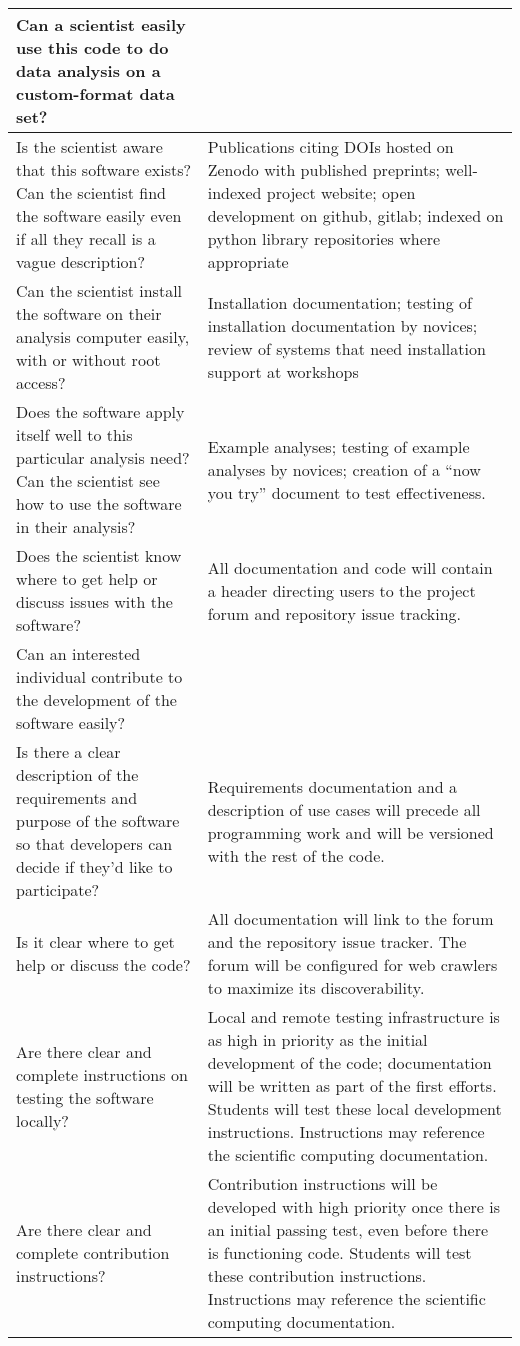 \begin{tabularx}{\textwidth}{XX}
    Can a scientist easily use this code to do data analysis on a custom-format data set? & \\
    \toprule

    Is the scientist aware that this software exists?  Can the scientist find the software easily even if all they recall is a vague description?
    & Publications citing DOIs hosted on Zenodo with published preprints; well-indexed project website; open development on github, gitlab; indexed on python library repositories where appropriate \\
    Can the scientist install the software on their analysis computer easily, with or without root access?
    & Installation documentation; testing of installation documentation by novices; review of systems that need installation support at workshops \\
    Does the software apply itself well to this particular analysis need?  Can the scientist see how to use the software in their analysis?
    & Example analyses; testing of example analyses by novices; creation of a ``now you try'' document to test effectiveness. \\
    Does the scientist know where to get help or discuss issues with the software?
    & All documentation and code will contain a header directing users to the project forum and repository issue tracking. \\


Can an interested individual contribute to the development of the software easily? & \\
\toprule

    Is there a clear description of the requirements and purpose of the software so that developers can decide if they'd like to participate?
    & Requirements documentation and a description of use cases will precede all programming work and will be versioned with the rest of the code.\\
    Is it clear where to get help or discuss the code?
    & All documentation will link to the forum and the repository issue tracker.  The forum will be configured for web crawlers to maximize its discoverability.\\
    Are there clear and complete instructions on testing the software locally?
    & Local and remote testing infrastructure is as high in priority as the initial development of the code; documentation will be written as part of the first efforts.  Students will test these local development instructions.  Instructions may reference the scientific computing documentation.\\
    Are there clear and complete contribution instructions?
    & Contribution instructions will be developed with high priority once there is an initial passing test, even before there is functioning code.  Students will test these contribution instructions.  Instructions may reference the scientific computing documentation.\\
\end{tabularx}


